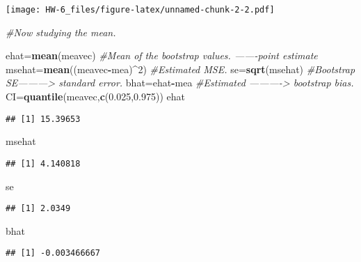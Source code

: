 \documentclass[]{article}
\newenvironment{Shaded}{\begin{snugshade}}{\end{snugshade}}
\newcommand{\CommentTok}[1]{\textcolor[rgb]{0.56,0.35,0.01}{\textit{#1}}}
\newcommand{\DecValTok}[1]{\textcolor[rgb]{0.00,0.00,0.81}{#1}}
\newcommand{\FloatTok}[1]{\textcolor[rgb]{0.00,0.00,0.81}{#1}}
\newcommand{\KeywordTok}[1]{\textcolor[rgb]{0.13,0.29,0.53}{\textbf{#1}}}
\newcommand{\NormalTok}[1]{#1}
\newcommand{\OperatorTok}[1]{\textcolor[rgb]{0.81,0.36,0.00}{\textbf{#1}}}
\begin{document}
\texttt{[image: HW-6\_files/figure-latex/unnamed-chunk-2-2.pdf]}

\begin{Shaded}
\begin{Highlighting}[]
\CommentTok{#Now studying the mean.}

\NormalTok{ehat=}\KeywordTok{mean}\NormalTok{(meavec) }\CommentTok{#Mean of the bootstrap values. -------point estimate}
\NormalTok{msehat=}\KeywordTok{mean}\NormalTok{((meavec}\OperatorTok{-}\NormalTok{mea)}\OperatorTok{^}\DecValTok{2}\NormalTok{) }\CommentTok{#Estimated MSE.}
\NormalTok{se=}\KeywordTok{sqrt}\NormalTok{(msehat) }\CommentTok{#Bootstrap SE---------> standard error.}
\NormalTok{bhat=ehat}\OperatorTok{-}\NormalTok{mea }\CommentTok{#Estimated ----------> bootstrap bias.}
\NormalTok{CI=}\KeywordTok{quantile}\NormalTok{(meavec,}\KeywordTok{c}\NormalTok{(}\FloatTok{0.025}\NormalTok{,}\FloatTok{0.975}\NormalTok{))}
\NormalTok{ehat}
\end{Highlighting}
\end{Shaded}

\begin{verbatim}
## [1] 15.39653
\end{verbatim}

\begin{Shaded}
\begin{Highlighting}[]
\NormalTok{msehat}
\end{Highlighting}
\end{Shaded}

\begin{verbatim}
## [1] 4.140818
\end{verbatim}

\begin{Shaded}
\begin{Highlighting}[]
\NormalTok{se}
\end{Highlighting}
\end{Shaded}

\begin{verbatim}
## [1] 2.0349
\end{verbatim}

\begin{Shaded}
\begin{Highlighting}[]
\NormalTok{bhat}
\end{Highlighting}
\end{Shaded}

\begin{verbatim}
## [1] -0.003466667
\end{verbatim}
\end{document}
